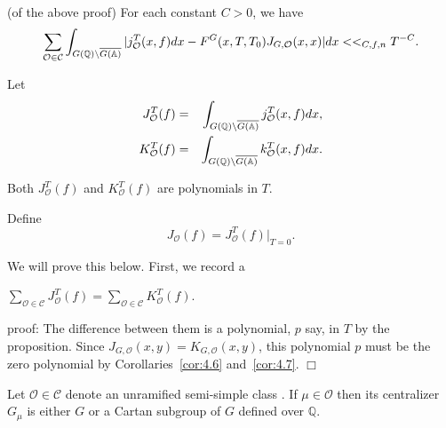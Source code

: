 \begin{corollary}\label{cor:4.7}
(of the above proof) For each constant $C>0$, we have 
\[
\sum_{{\mathcal{O}}\in {\mathcal{C}}}\int_{G({\mathbb{Q}})\backslash \overline{G(\mathbb{%
A})}}|j_{{\mathcal{O}}}^T(x,f)dx-F^G(x,T,T_0)J_{G,{\mathcal{O}}%
}(x,x)|dx<<_{C,f,n}T^{-C}. 
\]
\end{corollary}

Let 
\begin{eqnarray*}
J_{{\mathcal{O}}}^T(f) &=&\int_{G({\mathbb{Q}})\backslash \overline{G({\mathbb{A}})}}j_{%
{\mathcal{O}}}^T(x,f)dx, \\
K_{{\mathcal{O}}}^T(f) &=&\int_{G({\mathbb{Q}})\backslash \overline{G({\mathbb{A}})}}k_{%
{\mathcal{O}}}^T(x,f)dx.
\end{eqnarray*}

\begin{proposition}\label{prop:4.8}
Both $
J_{{\mathcal{O}}}^T(f)
$ and $K_{{\mathcal{O}}}^T(f)$ are polynomials in
$T$.
\end{proposition}

Define
\begin{equation}\label{eq:4.8}
J_{{\mathcal{O}}}(f)
=J_{{\mathcal{O}}}^T(f)|_{T=0}.
\end{equation}

We will prove this below. First, we record a

\begin{corollary}\label{cor:4.9}
$\sum_{{\mathcal{O}}\in {\mathcal{C}}}J_{{\mathcal{O}}}^T(f)=\sum_{{\mathcal{O}}\in 
{\mathcal{C}}}K_{{\mathcal{O}}}^T(f)$.
\end{corollary}

proof: The difference between them is a polynomial, $p$ say, in $T$ by the
proposition. Since $J_{G,{\mathcal{O}}}(x,y)=K_{G,{\mathcal{O}}}(x,y)$, this
polynomial $p$ must be the zero polynomial by Corollaries~\ref{cor:4.6}
and~\ref{cor:4.7}. $\Box $

Let ${\mathcal{O}}\in {\mathcal{C}}$ denote an unramified semi-simple class \cite[p. 949]{A2}. If $\mu \in {\mathcal{O}}$ then its centralizer $G_\mu $ is either $G$
or a Cartan subgroup of $G$ defined over ${\mathbb{Q}}$.

